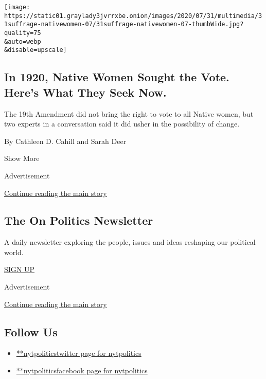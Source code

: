 \begin{enumerate}
  \texttt{[image: https://static01.graylady3jvrrxbe.onion/images/2020/07/31/multimedia/31suffrage-nativewomen-07/31suffrage-nativewomen-07-thumbWide.jpg?quality=75\\\&auto=webp\\\&disable=upscale]}

  \hypertarget{in-1920-native-women-sought-the-vote-heres-what-they-seek-now}{%
  \subsection{In 1920, Native Women Sought the Vote. Here's What They
  Seek
  Now.}\label{in-1920-native-women-sought-the-vote-heres-what-they-seek-now}}

  The 19th Amendment did not bring the right to vote to all Native
  women, but two experts in a conversation said it did usher in the
  possibility of change.

  By Cathleen D. Cahill and Sarah Deer
\end{enumerate}

Show More

Advertisement

\protect\hyperlink{after-mid2}{Continue reading the main story}

\hypertarget{the-on-politics-newsletter}{%
\subsection{The On Politics
Newsletter}\label{the-on-politics-newsletter}}

A daily newsletter exploring the people, issues and ideas reshaping our
political world.

\href{/newsletters/signup/CN}{SIGN UP}

Advertisement

\protect\hyperlink{after-mktg}{Continue reading the main story}

\hypertarget{follow-us}{%
\subsection{Follow Us}\label{follow-us}}

\begin{itemize}
\tightlist
\item
  \href{https://twitter.com/nytpolitics}{**nytpoliticstwitter page for
  nytpolitics}
\item
  \href{https://www.facebookcorewwwi.onion/nytpolitics}{**nytpoliticsfacebook
  page for nytpolitics}
\end{itemize}

